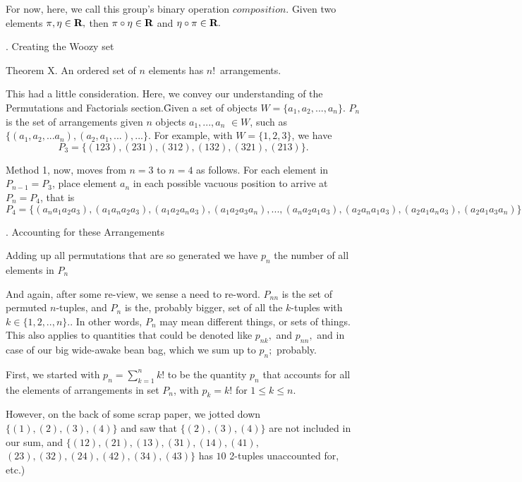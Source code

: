 \e
For now, here, we call this group's binary operation $composition$.
Given two elements
$\pi,\eta\in\hbox{\bf R},$ then
$\pi\circ\eta\in\hbox{\bf R}$ and $\eta\circ\pi\in\hbox{\bf R}.$


\eject

. Creating the Woozy set

\proclaim Theorem X. An ordered set of $n$ elements
has $n!$~arrangements.

This had a little consideration.  Here, we
convey our understanding of the Permutations and
Factorials section.\f

Given a set of objects $W=\{a_1,a_2,...,a_n\}$.
$P_n$ is the set of arrangements given $n$ objects
$a_1,...,a_n$ $\in W$, such as
$\{(a_1,a_2,...a_n),(a_2,a_1,...),...\}$. For example,
with $W=\{1,2,3\}$, we have
$$P_3=\{(123),(231),(312),(132),(321),(213)\}.$$

\e
Method 1, now, moves from $n=3$ to $n=4$ as follows.
For each element in $P_{n-1}=P_3$, place element
$a_n$ in each possible vacuous position to arrive at
$P_n=P_4$, that is
$$P_4=\{(a_na_1a_2a_3),
       (a_1a_na_2a_3),
       (a_1a_2a_na_3),
       (a_1a_2a_3a_n),
       ...,
       (a_na_2a_1a_3),
       (a_2a_na_1a_3),
       (a_2a_1a_na_3),
       (a_2a_1a_3a_n)\}$$

. Accounting for these Arrangements

\e
Adding up all permutations that are so generated we have
$p_n$ the number of all elements in $P_n$ %

\e
And again, after some re-view, we sense a need to re-word.
$P_{nn}$ is the set of permuted $n$-tuples, and $P_n$ is
the, probably bigger, set of all the $k$-tuples with
$k\in\{1,2,..,n\}.$. In other words, $P_n$
may mean different things, or sets of things. This also
applies to quantities that could be denoted like $p_{nk},$
and $p_{nn},$ and in case of our big wide-awake bean bag,
which we sum up to $p_n;$  probably.

\e
First, we started with $p_n=\sum_{k=1}^n k!$
to be the quantity
$p_n$ that accounts for all the elements of
arrangements in set $P_n$, 
with $p_k=k!$ for $1\le k\le n$.

However, on the back of some scrap paper, we jotted down
$\{(1),(2),(3),(4)\}$ and saw that $\{(2),(3),(4)\}$ are
not included in our sum, and
$\{(12),(21),(13),(31),(14),(41),$
$(23),(32),(24),(42),(34),(43)\}$ has $10$ 2-tuples unaccounted
for, etc.)

